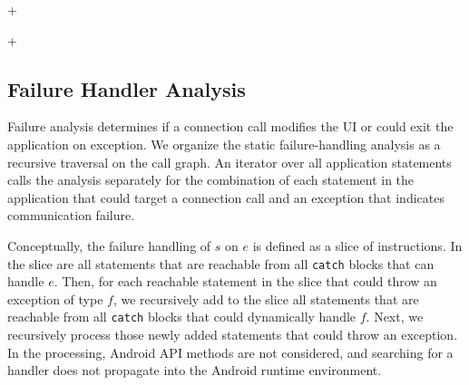 \lstDeleteShortInline+

\lstMakeShortInline[basicstyle=\scriptsize\ttfamily,keywordstyle=\color{DarkPurple},breaklines=false]+



\subsection{Failure Handler Analysis}
\label{sec:failure-handling}

Failure analysis determines if a connection call modifies the UI or
could exit the application on exception.  We organize the static
failure-handling analysis as a recursive traversal on the call graph.
An iterator over all application statements calls the analysis
separately for the combination of each statement in the application
that could target a connection call and an exception that indicates
communication failure.

Conceptually, the failure handling of $s$ on $e$ is defined as a slice
of instructions.  In the slice are all statements that are reachable
from all \lstinline!catch! blocks that can handle $e$.  Then, for each
reachable statement in the slice that could throw an exception of type
$f$, we recursively add to the slice all statements that are reachable
from all \lstinline!catch!  blocks that could dynamically handle $f$.
Next, we recursively process those newly added statements that could
throw an exception.  In the processing, Android API methods are not
considered, and searching for a handler does not propagate into the
Android runtime environment.

